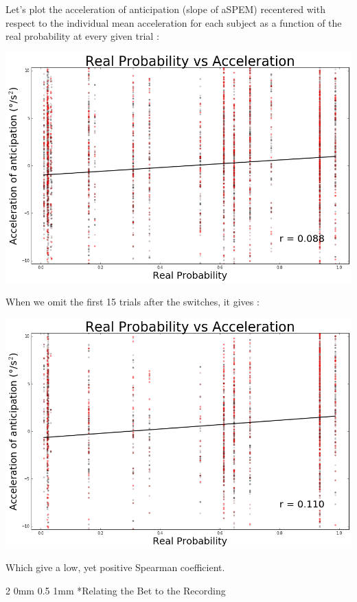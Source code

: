 \documentclass[profile,final,english, draft]{sciposter}%
\makeatletter
\renewcommand{\subsection}{\@startsection
        {subsection}%
        {2}%
        {0mm}%
        {0.5\baselineskip}%
        {1mm}%
        {\normalsize\color[rgb]{0.4,0,0}\bfseries}}%
\makeatother
\begin{document}
\begin{multicols}{3}
\columnbreak
Let's plot the acceleration of anticipation (slope of aSPEM) recentered with respect to the individual mean acceleration for each subject as a function of the real probability at every given trial :

\begin{center} 
    \includegraphics[width=1\columnwidth]{p_true--v_a_mean}
\end{center}

When we omit the first 15 trials after the switches, it gives :

\begin{center} 
    \includegraphics[width=1\columnwidth]{p_true--v_a_15_mean}
\end{center}

Which give a low, yet positive Spearman coefficient.

\subsection*{Relating the Bet to the Recording}


\end{multicols}
\end{document}
